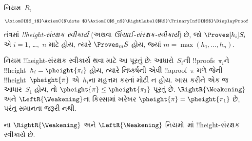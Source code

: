 \documentclass[../../../include/open-logic-section]{subfiles}
\begin{document}
\begin{defn}
નિયમ~$R$,
\[
\AxiomC{$S_1$}
\AxiomC{$\dots$}
\AxiomC{$S_n$}
\RightLabel{$R$}
\TrinaryInfC{$S$}
\DisplayProof
\]
તંત્રમાં \emph{!!{height}-સંરક્ષક સ્વીકાર્ય}
(અથવા \emph{ઊંચાઈ-સંરક્ષક-સ્વીકાર્ય}) છે, જો
$\Proves[h_i] S_i$ એ $i = 1$, \dots,~$n$ માટે હોય,
ત્યારે $\Proves_m S$ હોય, જ્યાં $m = \max(h_1, \dots,
h_n)$.
\end{defn}

નિયમ !!{height}-સંરક્ષક સ્વીકાર્ય થવા માટે આ પૂરતું છે:
આધારો~$S_i$ની !!{proof}s~$\pi_i$ને
!!{height}~$h_i = \pheight{\pi_i}$ હોય,
ત્યારે નિષ્કર્ષની એવી !!a{proof}~$\pi$ મળે
જેની !!{height}~$\pheight{\pi}$ એ~$h_i$ના મહત્તમ કરતાં મોટી ન હોય.
ખાસ કરીને એક જ આધાર~$S_1$ હોય,
તો $\pheight{\pi} \le \pheight{\pi_1}$ પૂરતું છે.
$\RightR{\Weakening}$ અને $\LeftR{\Weakening}$ના કિસ્સામાં
ખરેખર $\pheight{\pi} = \pheight{\pi_1}$ છે,
પરંતુ સમાનતા જરૂરી નથી.

\begin{prop}
ના $\RightR{\Weakening}$ અને $\LeftR{\Weakening}$
નિયમો~માં !!{height}-સંરક્ષક સ્વીકાર્ય છે.
\end{prop}
\end{document}
